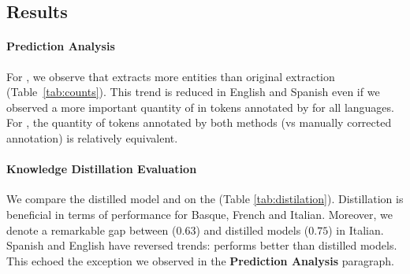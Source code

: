 \subsection{Results}
\paragraph{\instruct Prediction Analysis} For \layerTwo, we observe that \instruct extracts more entities than original extraction (Table~\ref{tab:counts}). This trend is reduced in English and Spanish even if we observed a more important quantity of \iclin in tokens annotated by \instruct for all languages. 
For \layerValidate, the quantity of tokens annotated by both methods (\instruct vs manually corrected annotation) is relatively equivalent. 

\begin{table}
\centering
\large
\resizebox{1\columnwidth}{!}{

}
\caption{The number of annotated tokens for each annotation type for the \layerTwo ($l_{2}$) and \layerValidate ($l_{val}$). The notation \textit{Gold} corresponds to the original extraction, and the notation \textit{GPT} correspond to the \instruct annotation.}
\label{tab:counts}
\end{table}

\paragraph{Knowledge Distillation Evaluation} We compare the distilled model and \instruct on the \layerOne (Table \ref{tab:distilation}). Distillation is beneficial in terms of performance for Basque, French and Italian. Moreover, we denote a remarkable gap between \instruct ($0.63$) and distilled models ($0.75$) in Italian. Spanish and English have reversed trends: \instruct performs better than distilled models. This echoed the exception we observed in the \textbf{\instruct Prediction Analysis} paragraph.

\begin{table}
    \centering
    \small
    \resizebox{1\columnwidth}{!}{
        
    }
    \caption{The mean F1-score of the models for each language in E3C using {\layerOne~} as evaluation set. We evaluate the direct output of {\instruct} and the aggregated mean score of each model for each language listed in Table \ref{tab:models} using \SettingA and {\instruct} annotation as a train set.}
    \label{tab:distilation}
\end{table}

